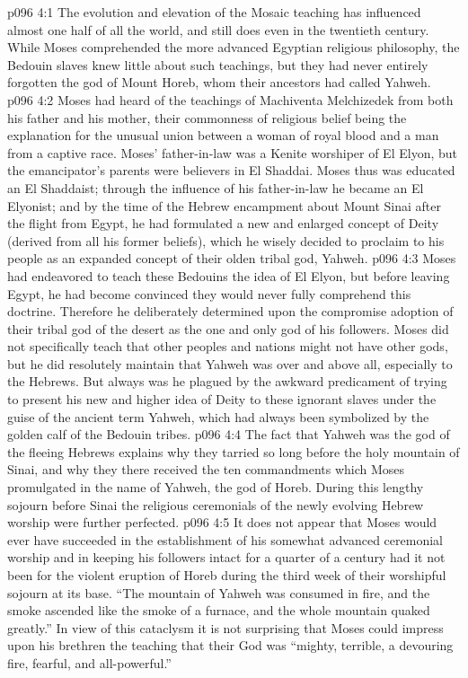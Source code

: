 \vs p096 4:1 The evolution and elevation of the Mosaic teaching has influenced almost one half of all the world, and still does even in the twentieth century. While Moses comprehended the more advanced Egyptian religious philosophy, the Bedouin slaves knew little about such teachings, but they had never entirely forgotten the god of Mount Horeb, whom their ancestors had called Yahweh.
\vs p096 4:2 Moses had heard of the teachings of Machiventa Melchizedek from both his father and his mother, their commonness of religious belief being the explanation for the unusual union between a woman of royal blood and a man from a captive race. Moses’ father\hyp{}in\hyp{}law was a Kenite worshiper of El Elyon, but the emancipator’s parents were believers in El Shaddai. Moses thus was educated an El Shaddaist; through the influence of his father\hyp{}in\hyp{}law he became an El Elyonist; and by the time of the Hebrew encampment about Mount Sinai after the flight from Egypt, he had formulated a new and enlarged concept of Deity (derived from all his former beliefs), which he wisely decided to proclaim to his people as an expanded concept of their olden tribal god, Yahweh.
\vs p096 4:3 Moses had endeavored to teach these Bedouins the idea of El Elyon, but before leaving Egypt, he had become convinced they would never fully comprehend this doctrine. Therefore he deliberately determined upon the compromise adoption of their tribal god of the desert as the one and only god of his followers. Moses did not specifically teach that other peoples and nations might not have other gods, but he did resolutely maintain that Yahweh was over and above all, especially to the Hebrews. But always was he plagued by the awkward predicament of trying to present his new and higher idea of Deity to these ignorant slaves under the guise of the ancient term Yahweh, which had always been symbolized by the golden calf of the Bedouin tribes.
\pc \vs p096 4:4 The fact that Yahweh was the god of the fleeing Hebrews explains why they tarried so long before the holy mountain of Sinai, and why they there received the ten commandments which Moses promulgated in the name of Yahweh, the god of Horeb. During this lengthy sojourn before Sinai the religious ceremonials of the newly evolving Hebrew worship were further perfected.
\pc \vs p096 4:5 It does not appear that Moses would ever have succeeded in the establishment of his somewhat advanced ceremonial worship and in keeping his followers intact for a quarter of a century had it not been for the violent eruption of Horeb during the third week of their worshipful sojourn at its base. “The mountain of Yahweh was consumed in fire, and the smoke ascended like the smoke of a furnace, and the whole mountain quaked greatly.” In view of this cataclysm it is not surprising that Moses could impress upon his brethren the teaching that their God was “mighty, terrible, a devouring fire, fearful, and all\hyp{}powerful.”
